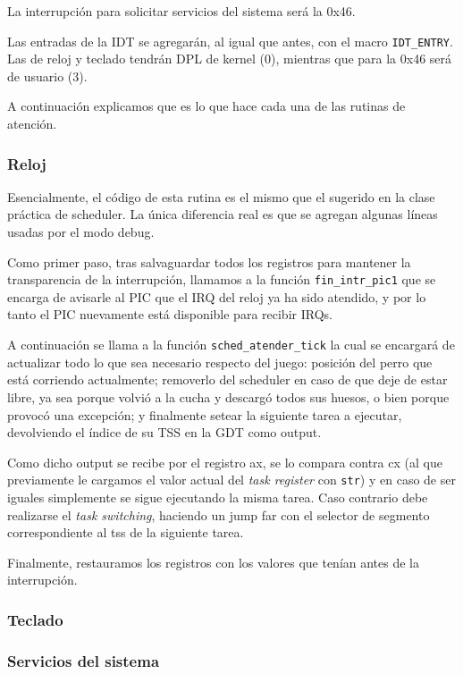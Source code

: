 La interrupción para solicitar servicios del sistema será la 0x46.

Las entradas de la IDT se agregarán, al igual que antes, con el macro \texttt{IDT\_ENTRY}. Las de reloj y teclado tendrán DPL de kernel (0), mientras que para la 0x46 será de usuario (3).

A continuación explicamos que es lo que hace cada una de las rutinas de atención.

	\subsubsection{Reloj}
	Esencialmente, el código de esta rutina es el mismo que el sugerido en la clase práctica de scheduler. La única diferencia real es que se agregan algunas líneas usadas por el modo debug.

	Como primer paso, tras salvaguardar todos los registros para mantener la transparencia de la interrupción, llamamos a la función \texttt{fin\_intr\_pic1} que se encarga de avisarle al PIC que el IRQ del reloj ya ha sido atendido, y por lo tanto el PIC nuevamente está disponible para recibir IRQs. 

	A continuación se llama a la función \texttt{sched\_atender\_tick} la cual se encargará de actualizar todo lo que sea necesario respecto del juego: posición del perro que está corriendo actualmente; removerlo del scheduler en caso de que deje de estar libre, ya sea porque volvió a la cucha y descargó todos sus huesos, o bien porque provocó una excepción; y finalmente setear la siguiente tarea a ejecutar, devolviendo el índice de su TSS en la GDT como output.

	Como dicho output se recibe por el registro ax, se lo compara contra cx (al que previamente le cargamos el valor actual del \textit{task register} con \texttt{str}) y en caso de ser iguales simplemente se sigue ejecutando la misma tarea. Caso contrario debe realizarse el \textit{task switching}, haciendo un jump far con el selector de segmento correspondiente al tss de la siguiente tarea.

	Finalmente, restauramos los registros con los valores que tenían antes de la interrupción.

	\subsubsection{Teclado}

	\subsubsection{Servicios del sistema}

